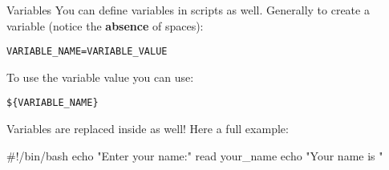\begin{frame}[fragile]{Variables}
	You can define variables in scripts as well. Generally to create a variable (notice the \textbf{absence} of spaces):
	
\begin{verbatim}
VARIABLE_NAME=VARIABLE_VALUE
\end{verbatim}

	To use the variable value you can use:
	
\begin{verbatim}
${VARIABLE_NAME}
\end{verbatim}

	Variables are replaced inside  as well! Here a full example:
	
\begin{verbbox}
	#!/bin/bash
	echo "Enter your name:"
	read your_name
	echo "Your name is "
\end{verbbox}
\fbox{\theverbbox[t]}

\end{frame}